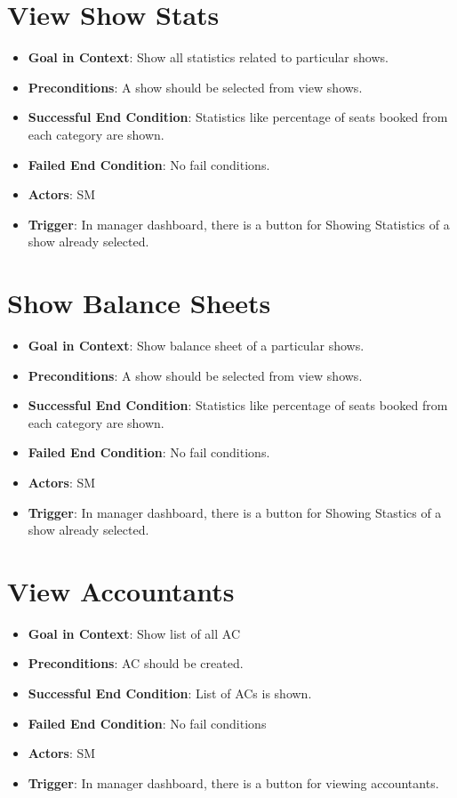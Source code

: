 \documentclass{scrreprt}
\begin{document}
\section{View Show Stats}
\begin{itemize}
\item \textbf{Goal in Context}: Show all statistics related to particular shows.
\item \textbf{Preconditions}: A show should be selected from view shows.
\item \textbf{Successful End Condition}: Statistics like percentage of seats booked from each category are shown.
\item \textbf{Failed End Condition}: No fail conditions.
\item \textbf{Actors}: SM
\item \textbf{Trigger}: In manager dashboard, there is a button for Showing Statistics of a show already selected.
\end{itemize}

\section{Show Balance Sheets}
\begin{itemize}
\item \textbf{Goal in Context}: Show balance sheet of a particular shows.
\item \textbf{Preconditions}: A show should be selected from view shows.
\item \textbf{Successful End Condition}: Statistics like percentage of seats booked from each category are shown.
\item \textbf{Failed End Condition}: No fail conditions.
\item \textbf{Actors}: SM
\item \textbf{Trigger}: In manager dashboard, there is a button for Showing Stastics of a show already selected.
\end{itemize}


\section{View Accountants}
\begin{itemize}
\item \textbf{Goal in Context}: Show list of all AC
\item \textbf{Preconditions}: AC should be created.
\item \textbf{Successful End Condition}: List of ACs is shown.
\item \textbf{Failed End Condition}: No fail conditions
\item \textbf{Actors}: SM
\item \textbf{Trigger}: In manager dashboard, there is a button for viewing accountants.
\end{itemize}
\end{document}
